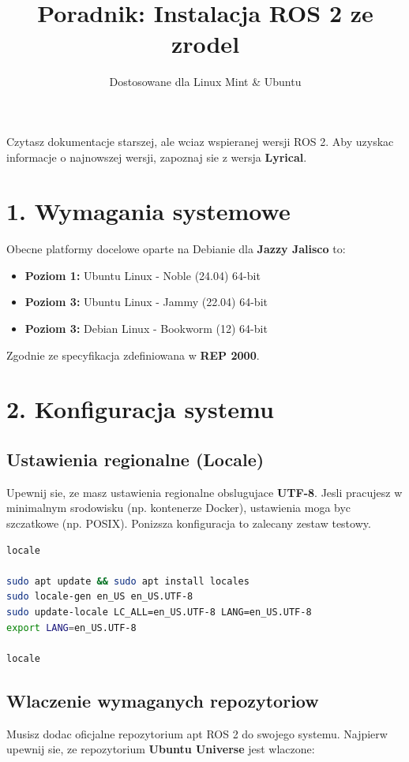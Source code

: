 \documentclass[11pt,a4paper]{article}
\title{\Huge\bfseries\color{mintdark} Poradnik: Instalacja \color{techgreen}ROS 2 \color{mintdark}ze zrodel}
\author{\large Dostosowane dla Linux Mint \& Ubuntu}
\date{}
\begin{document}
\maketitle

\begin{tcolorbox}[colback=codebg, colframe=mintdark]
Czytasz dokumentacje starszej, ale wciaz wspieranej wersji ROS 2. Aby uzyskac informacje o najnowszej wersji, zapoznaj sie z wersja \textbf{\color{techgreen}Lyrical}.
\end{tcolorbox}

\tableofcontents
\newpage

\section{\color{techgreen}1. Wymagania systemowe}
Obecne platformy docelowe oparte na Debianie dla \textbf{Jazzy Jalisco} to:
\begin{itemize}
    \item \textbf{Poziom 1:} Ubuntu Linux - Noble (24.04) 64-bit
    \item \textbf{Poziom 3:} Ubuntu Linux - Jammy (22.04) 64-bit
    \item \textbf{Poziom 3:} Debian Linux - Bookworm (12) 64-bit
\end{itemize}
Zgodnie ze specyfikacja zdefiniowana w \textbf{REP 2000}.

\section{\color{techgreen}2. Konfiguracja systemu}

\subsection{Ustawienia regionalne (Locale)}
Upewnij sie, ze masz ustawienia regionalne obslugujace \textbf{UTF-8}. Jesli pracujesz w minimalnym srodowisku (np. kontenerze Docker), ustawienia moga byc szczatkowe (np. POSIX). Ponizsza konfiguracja to zalecany zestaw testowy.

\begin{lstlisting}[language=bash]
locale

sudo apt update && sudo apt install locales
sudo locale-gen en_US en_US.UTF-8
sudo update-locale LC_ALL=en_US.UTF-8 LANG=en_US.UTF-8
export LANG=en_US.UTF-8

locale
\end{lstlisting}

\subsection{Wlaczenie wymaganych repozytoriow}
Musisz dodac oficjalne repozytorium apt ROS 2 do swojego systemu. Najpierw upewnij sie, ze repozytorium \textbf{Ubuntu Universe} jest wlaczone:
\end{document}
